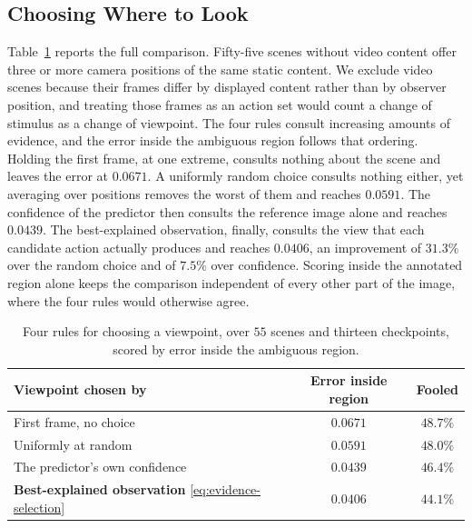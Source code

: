 \documentclass{article} %
\theoremstyle{defstyle}
\theoremstyle{plain}
\begin{document}
\subsection{Choosing Where to Look}
\label{sec:supp-viewpoint}

Table~\ref{tab:supp-viewpoint} reports the full comparison. Fifty-five scenes without video
content offer three or more camera positions of the same static content. We exclude video
scenes because their frames differ by displayed content rather than by observer position, and
treating those frames as an action set would count a change of stimulus as a change of
viewpoint. The four rules consult increasing amounts of evidence, and the error inside the
ambiguous region follows that ordering. Holding the first frame, at one extreme, consults
nothing about the scene and leaves the error at $0.0671$. A uniformly random choice consults
nothing either, yet averaging over positions removes the worst of them and reaches $0.0591$.
The confidence of the predictor then consults the reference image alone and reaches $0.0439$.
The best-explained observation, finally, consults the view that each candidate action actually
produces and reaches $0.0406$, an improvement of $31.3\%$ over the random choice and of $7.5\%$
over confidence. Scoring inside the annotated region alone keeps the comparison independent of
every other part of the image, where the four rules would otherwise agree.

\begin{table}[htb]
\caption{Four rules for choosing a viewpoint, over $55$ scenes and thirteen checkpoints, scored by error inside the ambiguous region.}
\label{tab:supp-viewpoint}
\begin{center}
\footnotesize
\begin{tabular}{lcc}
\toprule
\textbf{Viewpoint chosen by} & \textbf{Error inside region} & \textbf{Fooled} \\
\midrule
First frame, no choice          & $0.0671$ & $48.7\%$ \\
Uniformly at random             & $0.0591$ & $48.0\%$ \\
The predictor's own confidence  & $0.0439$ & $46.4\%$ \\
\textbf{Best-explained observation} \eqref{eq:evidence-selection} & $\mathbf{0.0406}$ & $\mathbf{44.1\%}$  \\
\bottomrule
\end{tabular}
\end{center}
\end{table}
\end{document}
